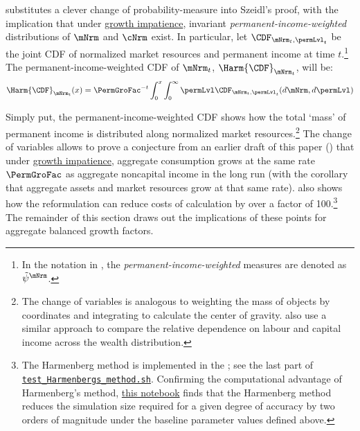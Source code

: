 \documentclass[BufferStockTheory]{subfiles}
\begin{document}
\cite{harmenbergInvariant} substitutes a clever change of probability-measure into Szeidl's proof, with the implication that under \hyperlink{GIC}{growth impatience}, invariant \emph{permanent-income-weighted} distributions of $\mNrm$ and $\cNrm$ exist.
In particular, let $\CDF_{\mNrm_{t},\permLvl_{t}}$ be the joint CDF of normalized market resources and permanent income at time $t$.\footnote{In the notation in \cite{harmenbergInvariant}, the \emph{permanent-income-weighted} measures are denoted as $\tilde{\psi}^{\mNrm}$.} The permanent-income-weighted CDF of $\mNrm_{t}$, $\Harm{\CDF}_{\mNrm_{t}}$, will be:
%
\begin{equation}\label{eq:HarmCDF}
\Harm{\CDF}_{\mNrm_{t}}(x) = \PermGroFac^{-t}\int_{0}^{x}\int_{0}^{\infty} \permLvl\CDF_{\mNrm_{t},\permLvl_{t}}(d\mNrm,d\permLvl)
\end{equation}

Simply put, the permanent-income-weighted CDF shows how the total `mass' of permanent income is distributed along normalized market resources.\footnote{The change of variables is analogous to weighting the mass of objects by coordinates and integrating to calculate the center of gravity.
\cite{wolf2021play} also use a similar approach to compare the relative dependence on labour and capital income across the wealth distribution.} The change of variables allows \cite{harmenbergInvariant} to prove a conjecture from an earlier draft of this paper (\cite{BufferStockTheoryQESubmit}) that under \hyperlink{GIC}{growth impatience}, aggregate consumption grows at the same rate $\PermGroFac$ as aggregate noncapital income in the long run (with the corollary that aggregate assets and market resources grow at that same rate).\hypertarget{test-Harmenbergs-method}{} \cite{harmenbergInvariant} also shows how the reformulation can reduce costs of calculation by over a factor of 100.\footnote{The Harmenberg method is implemented in the {\ARKurl}; see the last part of \href{https://github.com/econ-ark/BufferStockTheory/blob/master/Code/Python/test_Harmenbergs_method.sh}{\texttt{test\_Harmenbergs\_method.sh}}.
Confirming the computational advantage of Harmenberg's method, \href{https://econ-ark.org/materials/harmenberg-aggregation}{this notebook} finds that the Harmenberg method reduces the simulation size required for a given degree of accuracy by two orders of magnitude under the baseline parameter values defined above.} The remainder of this section draws out the implications of these points for aggregate balanced growth factors.
\end{document}

